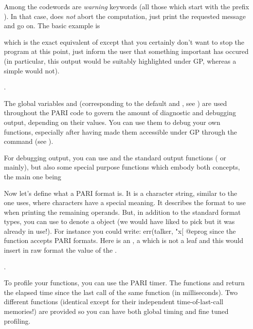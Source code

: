 \noindent
Among the codewords are {\it warning\/} keywords (all those which start with
the prefix ). In that case,  does {\it not\/} abort the
computation, just print the requested message and go on. The basic example is


\noindent which is the exact equivalent of  except that
you certainly don't want to stop the program at this point, just inform the
user that something important has occured (in particular, this output would be
suitably highlighted under GP, whereas a simple  would not).

.\label{se:dbg_output}

\noindent
The global variables  and  (corresponding
to the default  and , see )
are used throughout the PARI code to govern the amount of diagnostic and
debugging output, depending on their values. You can use them to debug your
own functions, especially after having made them accessible under GP through
the command  (see ).

For debugging output, you can use  and the standard output
functions ( or  mainly), but also some special purpose
functions which embody both concepts, the main one being


\noindent
Now let's define what a PARI format is. It is a character string, similar
to the one  uses, where \kbd{\%} characters have a special
meaning. It describes the format to use when printing the remaining operands.
But, in addition to the standard format types, you can use  to
denote a  object (we would have liked to pick  but it was
already in use!). For instance you could write:
\bprog
err(talker, "x[%
@eprog
\noindent since the  function accepts PARI formats. Here 
is an ,  a  which is not a leaf and this would
insert in raw format the value of the  .

.

\noindent
To profile your functions, you can use the PARI timer. The functions
 and  return the elapsed time since
the last call of the same function (in milliseconds). Two different
functions (identical except for their independent time-of-last-call
memories!) are provided so you can have both global timing and fine tuned
profiling.

